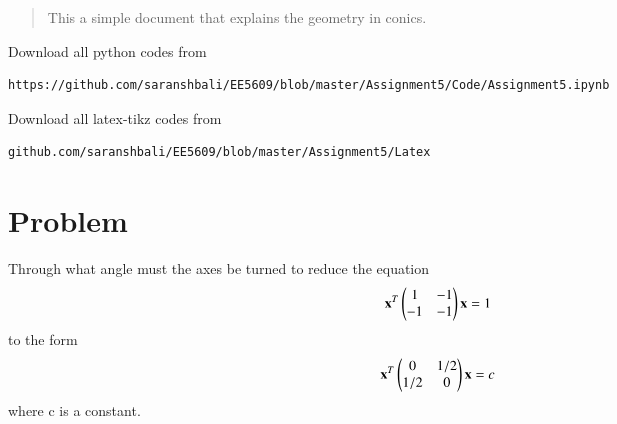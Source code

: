 \documentclass[journal,12pt,twocolumn]{IEEEtran}
\begin{document}
%
\begin{abstract}
This a simple document that explains the geometry in conics.
\end{abstract}
Download all python codes from 
%
\begin{lstlisting}
https://github.com/saranshbali/EE5609/blob/master/Assignment5/Code/Assignment5.ipynb
\end{lstlisting}
%
Download all latex-tikz codes from 
% 
\begin{lstlisting}
github.com/saranshbali/EE5609/blob/master/Assignment5/Latex
\end{lstlisting}
%
\section{Problem}
Through what angle must the axes be turned to reduce the equation
\begin{align}
	\mathbf{x}^T\begin{pmatrix} 1 & -1 \\ -1 & -1\end{pmatrix}\mathbf{x} = 1 \label{1}
\end{align}
to the form
\begin{align}
	\mathbf{x}^T\begin{pmatrix} 0 & 1/2 \\ 1/2 & 0\end{pmatrix}\mathbf{x} = c \label{3}
\end{align}
where c is a constant.
\end{document}
